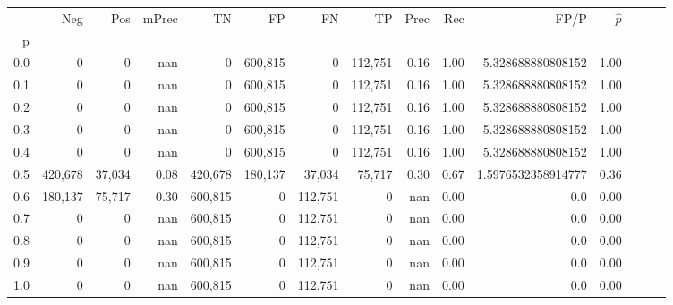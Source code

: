 \begin{tabular}{rrrrrrrrrrrrrrr}
\toprule
{} &      Neg &     Pos & mPrec &       TN &       FP &       FN &       TP &  Prec &   Rec &                FP/P & $\hat{p}$ \\
p   &          &         &       &          &          &          &          &       &       &                     &           \\
\midrule
0.0 &        0 &       0 &   nan &        0 &  600,815 &        0 &  112,751 &  0.16 &  1.00 &   5.328688880808152 &      1.00 \\
0.1 &        0 &       0 &   nan &        0 &  600,815 &        0 &  112,751 &  0.16 &  1.00 &   5.328688880808152 &      1.00 \\
0.2 &        0 &       0 &   nan &        0 &  600,815 &        0 &  112,751 &  0.16 &  1.00 &   5.328688880808152 &      1.00 \\
0.3 &        0 &       0 &   nan &        0 &  600,815 &        0 &  112,751 &  0.16 &  1.00 &   5.328688880808152 &      1.00 \\
0.4 &        0 &       0 &   nan &        0 &  600,815 &        0 &  112,751 &  0.16 &  1.00 &   5.328688880808152 &      1.00 \\
0.5 &  420,678 &  37,034 &  0.08 &  420,678 &  180,137 &   37,034 &   75,717 &  0.30 &  0.67 &  1.5976532358914777 &      0.36 \\
0.6 &  180,137 &  75,717 &  0.30 &  600,815 &        0 &  112,751 &        0 &   nan &  0.00 &                 0.0 &      0.00 \\
0.7 &        0 &       0 &   nan &  600,815 &        0 &  112,751 &        0 &   nan &  0.00 &                 0.0 &      0.00 \\
0.8 &        0 &       0 &   nan &  600,815 &        0 &  112,751 &        0 &   nan &  0.00 &                 0.0 &      0.00 \\
0.9 &        0 &       0 &   nan &  600,815 &        0 &  112,751 &        0 &   nan &  0.00 &                 0.0 &      0.00 \\
1.0 &        0 &       0 &   nan &  600,815 &        0 &  112,751 &        0 &   nan &  0.00 &                 0.0 &      0.00 \\
\bottomrule
\end{tabular}
